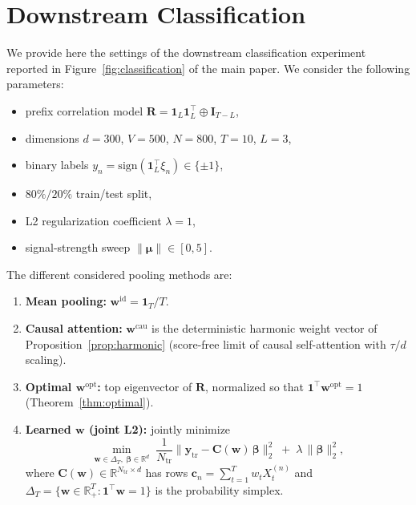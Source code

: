 \documentclass{article}
\def\vone{{\bm{1}}}
\def\vmu{{\bm{\mu}}}
\def\vc{{\bm{c}}}
\def\vw{{\bm{w}}}
\def\vy{{\bm{y}}}
\def\vbeta{{\bm{\beta}}}
\def\mC{{\bm{C}}}
\def\mI{{\bm{I}}}
\def\mR{{\bm{R}}}
\def\sR{{\mathbb{R}}}
\newcommand{\cau}{\mathrm{cau}}
\newcommand{\id}{\mathrm{id}}
\newcommand{\opt}{\mathrm{opt}}
\begin{document}
\section{Downstream Classification}\label{appendix:classif}

We provide here the settings of the downstream classification experiment reported in Figure~\ref{fig:classification} of the main paper. We consider the following parameters:
\begin{itemize}
    \item prefix correlation model $\mR = \vone_L\vone_L^\top \oplus \mI_{T-L}$,
    \item dimensions $d=300$, $V=500$, $N=800$, $T=10$, $L=3$,
    \item binary labels $y_n = \mathrm{sign}(\vone_L^\top \xi_n)\in\{\pm 1\}$,
    \item $80\%/20\%$ train/test split,
    \item L2 regularization coefficient $\lambda=1$,
    \item signal-strength sweep $\|\vmu\|\in[0,5]$.
\end{itemize}

The different considered pooling methods are:
\begin{enumerate}
    \item[(i)]   \textbf{Mean pooling:} $\vw^{\id} = \vone_T/T$.
    \item[(ii)]  \textbf{Causal attention:} $\vw^{\cau}$ is the
                 deterministic harmonic weight vector of Proposition~\ref{prop:harmonic}
                 (score-free limit of causal self-attention with
                 $\tau/d$ scaling).
    \item[(iii)] \textbf{Optimal $\vw^{\opt}$:} top eigenvector of $\mR$,
                 normalized so that $\vone^\top \vw^{\opt}=1$
                 (Theorem~\ref{thm:optimal}).
    \item[(iv)] \textbf{Learned $\vw$ (joint L2):} jointly minimize
    \begin{equation}\label{eq:joint_l2}
        \min_{\vw\in\Delta_T,\; \vbeta\in\sR^d}
        \;\frac{1}{N_\mathrm{tr}}\bigl\| \vy_\mathrm{tr}
            - \mC(\vw)\,\vbeta \bigr\|_2^2
        \;+\; \lambda\,\|\vbeta\|_2^2,
    \end{equation}
    where $\mC(\vw)\in\sR^{N_\mathrm{tr}\times d}$ has rows
    $\vc_n = \sum_{t=1}^T w_t X_t^{(n)}$ and
    $\Delta_T = \{\vw\in\sR_+^T : \vone^\top\vw = 1\}$ is the
    probability simplex.
\end{enumerate}
\end{document}
